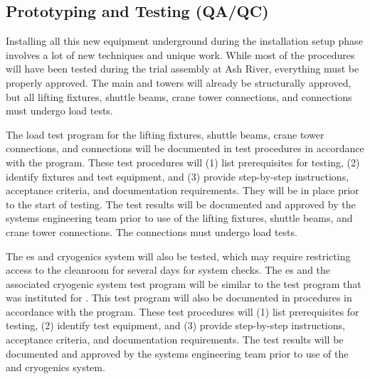 \subsection{Prototyping and Testing (QA/QC)}
\label{sec:fdsp-tc-infr-qaqc}


Installing all this new equipment underground during the installation setup phase involves a lot of new techniques  and unique work. While most of the procedures will have been tested during the trial assembly at Ash River, everything must be properly approved. The main  and  towers will already be structurally approved, but all lifting fixtures, shuttle beams, crane tower connections, and \coldbox connections must undergo load tests. 


The load test program for the lifting fixtures, shuttle beams, crane tower connections, and \coldbox connections will be documented in test procedures in accordance with the    program.  
These test procedures will (1) list prerequisites for testing, (2) identify fixtures and test equipment, and (3) provide step-by-step instructions, acceptance criteria, and documentation requirements.
They will be in place prior to the start of testing. 
The test results will be documented and approved by the systems engineering team prior to use of the lifting fixtures, shuttle beams, and crane tower connections. The \coldbox connections must undergo load tests. 

The \coldbox{}es and cryogenics system will also be tested, which may require restricting  access to the cleanroom  %
for several days for system checks. 
The \coldbox{}es and the associated cryogenic system test program will be similar to the test program that was instituted for . 
This test program will also be documented in procedures in accordance with the    program. %
These test procedures will (1) list prerequisites for testing, (2) identify test equipment, and (3) provide step-by-step instructions, acceptance criteria, and documentation requirements.
 The test results will be documented and approved by the systems engineering team prior to use of the \coldbox and cryogenics system.

